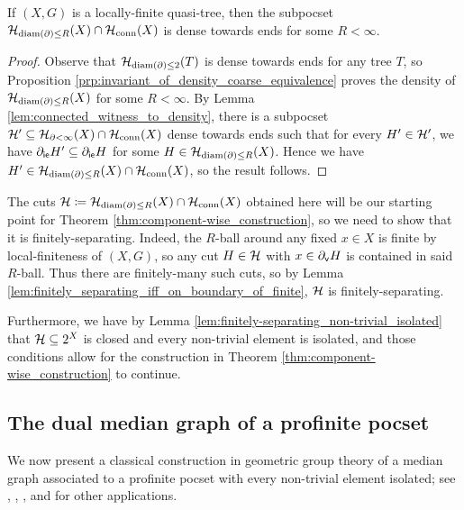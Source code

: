 \documentclass[reqno]{amsart}
\begin{document}
    \begin{corollary}\label{cor:density_of_bounded_diameter_boundary_cuts_quasi_tree}
        If $(X,G)$ is a locally-finite quasi-tree, then the subpocset $\mathcal{H}_{\operatorname{diam}(\partial)\leq R}(X)\cap\mathcal{H}_\mathrm{conn}(X)$ is dense towards ends for some $R<\infty$.
    \end{corollary}
    \begin{proof}
        Observe that $\mathcal{H}_{\operatorname{diam}(\partial)\leq2}(T)$ is dense towards ends for any tree $T$, so Proposition \ref{prp:invariant_of_density_coarse_equivalence} proves the density of $\mathcal{H}_{\operatorname{diam}(\partial)\leq R}(X)$ for some $R<\infty$. By Lemma \ref{lem:connected_witness_to_density}, there is a subpocset $\mathcal{H}'\subseteq\mathcal{H}_{\partial<\infty}(X)\cap\mathcal{H}_\mathrm{conn}(X)$ dense towards ends such that for every $H'\in\mathcal{H}'$, we have $\partial_\mathsf{ie}H'\subseteq\partial_\mathsf{ie}H$ for some $H\in\mathcal{H}_{\operatorname{diam}(\partial)\leq R}(X)$. Hence we have $H'\in\mathcal{H}_{\operatorname{diam}(\partial)\leq R}(X)\cap\mathcal{H}_\mathrm{conn}(X)$, so the result follows.
    \end{proof}

    The cuts $\mathcal{H}\coloneqq\mathcal{H}_{\operatorname{diam}(\partial)\leq R}(X)\cap\mathcal{H}_\mathrm{conn}(X)$ obtained here will be our starting point for Theorem \ref{thm:component-wise_construction}, so we need to show that it is finitely-separating. Indeed, the $R$-ball around any fixed $x\in X$ is finite by local-finiteness of $(X,G)$, so any cut $H\in\mathcal{H}$ with $x\in\partial_\mathsf{v}H$ is contained in said $R$-ball. Thus there are finitely-many such cuts, so by Lemma \ref{lem:finitely_separating_iff_on_boundary_of_finite}, $\mathcal{H}$ is finitely-separating.

    Furthermore, we have by Lemma \ref{lem:finitely-separating_non-trivial_isolated} that $\mathcal{H}\subseteq2^X$ is closed and every non-trivial element is isolated, and those conditions allow for the construction in Theorem \ref{thm:component-wise_construction} to continue.

    \subsection{The dual median graph of a profinite pocset}\label{sec:the_dual_median_graph_of_a_pocset}

    We now present a classical construction in geometric group theory of a median graph associated to a profinite pocset with every non-trivial element isolated; see \cite{Dun79}, \cite{Rol98}, \cite{Sag95}, and \cite{NR03} for other applications.
\end{document}
